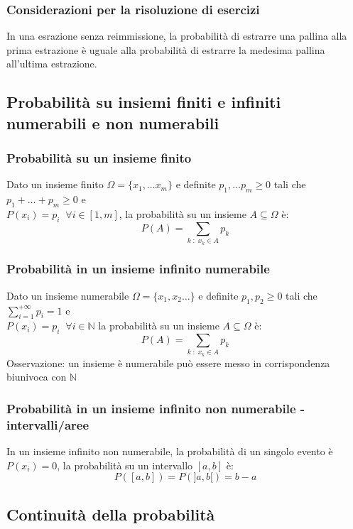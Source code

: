 \documentclass[a4paper]{article}
\begin{document}
\subsubsection*{Considerazioni per la risoluzione di esercizi}
In una esrazione senza reimmissione, la probabilità di estrarre una pallina alla prima estrazione è uguale alla probabilità di
estrarre la medesima pallina all'ultima estrazione.

\newpage

\subsection{Probabilità su insiemi finiti e infiniti numerabili e non numerabili}
\subsubsection*{Probabilità su un insieme finito}
Dato un insieme finito \(\Omega = \{x_1, \dots x_m\}\) e definite \(p_1, \dots p_m \geq 0\) tali che \(p_1 + \dots + p_m \geq 0\) e \\
\(P(x_i) = p_i \;\; \forall i \in [1,m]\), la probabilità su un insieme \(A \subseteq \Omega\) è:
\[P(A) = \sum_{k \; : \; x_k \in A} p_k\]

\subsubsection*{Probabilità in un insieme infinito numerabile}
Dato un insieme numerabile \(\Omega = \{x_1,x_2 \dots\}\) e definite \(p_1,p_2 \geq 0\) tali che \(\sum_{i=1}^{+\infty} p_i = 1\) e \\
\(P(x_i) = p_i \;\; \forall i \in \mathbb{N}\) la probabilità su un insieme \(A \subseteq \Omega\) è:
\[P(A) = \sum_{k \; : \; x_k \in A} p_k\]
Osservazione: un insieme è numerabile può essere messo in corrispondenza biunivoca con \(\mathbb{N}\)

\subsubsection*{Probabilità in un insieme infinito non numerabile - intervalli/aree}
In un insieme infinito non numerabile, la probabilità di un singolo evento è \(P(x_i) = 0\), la probabilità su un intervallo \([a,b]\)
è: \[P([a,b]) = P(]a,b[) = b-a\]

\subsection{Continuità della probabilità}
\end{document}
